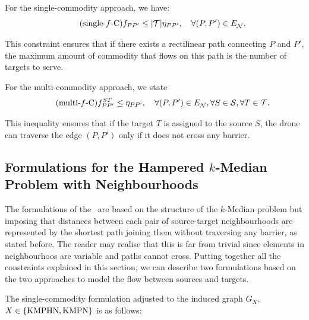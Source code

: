 \documentclass[a4paper,  review, authoryear, 1p.]{elsarticle}
\newcommand{\KMPHN}{{\sf{H-KMPHN}}}
\newcommand{\KMPN}{{\sf{H-KMPN}\xspace }}
\newcommand{\EN}{{E^{}_{\mathcal N}}}
\begin{document}
	For the single-commodity approach, we have:
	\begin{equation*}\tag{single-$f$-C}\label{eq:single-fC}
		f_{PP'}\leq  |\mathcal T|\etavar{P}{P'},\quad\forall (P, P')\in \EN.
	\end{equation*}
	
	This constraint ensures that if there exists a rectilinear path connecting $P$ and $P'$, the maximum amount of commodity that flows on this path is the number of targets to serve.
	
	For the multi-commodity approach, we state
	\begin{equation*}\tag{multi-$f$-C}\label{eq:multi-fC}
		f_{PP'}^{ST}\leq  \etavar{P}{P'},\quad\forall (P, P')\in \EN, \forall S\in\mathcal S, \forall T\in\mathcal T.
	\end{equation*}

	This inequality ensures that if the target $T$ is assigned to the source $S$, the drone can traverse the edge $(P, P')$ only if it does not cross any barrier.
	
 
		
	\subsection{Formulations for the Hampered $k$-Median Problem with Neighbourhoods}\label{ssec:KMPHN}
	
	The formulations of the \KMPN \ are based on the structure of the  $k$-Median problem but imposing that distances between each pair of source-target neighbourhoods are represented by the shortest path joining them without traversing any barrier, as stated before. The reader may realise that this is far from trivial since elements in neighbourhoos are variable and paths cannot cross. Putting together all the constraints explained in this section, we can describe two formulations based on the two approaches to model the flow between sources and targets. 
		
	The single-commodity formulation adjusted to the induced graph $G_X$, $X\in \{\rm KMPHN, \rm KMPN\}$ is as follows:
	
	
\end{document}
